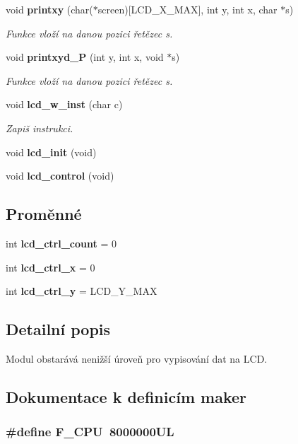 \begin{DoxyCompactItemize}
void {\bf printxy} (char($\ast$screen)[LCD\_\-X\_\-MAX], int y, int x, char $\ast$s)
\begin{DoxyCompactList}\small\item\em Funkce vloží na danou pozici řetězec {\itshape s\/}. \item\end{DoxyCompactList}\item 
void {\bf printxyd\_\-P} (int y, int x, void $\ast$s)
\begin{DoxyCompactList}\small\item\em Funkce vloží na danou pozici řetězec {\itshape s\/}. \item\end{DoxyCompactList}\item 
void {\bf lcd\_\-w\_\-inst} (char c)
\begin{DoxyCompactList}\small\item\em Zapiš instrukci. \item\end{DoxyCompactList}\item 
void {\bf lcd\_\-init} (void)
\item 
void {\bf lcd\_\-control} (void)
\end{DoxyCompactItemize}
\subsection*{Proměnné}
\begin{DoxyCompactItemize}
\item 
int {\bf lcd\_\-ctrl\_\-count} = 0
\item 
int {\bf lcd\_\-ctrl\_\-x} = 0
\item 
int {\bf lcd\_\-ctrl\_\-y} = LCD\_\-Y\_\-MAX
\end{DoxyCompactItemize}


\subsection{Detailní popis}
Modul obstarává nenižší úroveň pro vypisování dat na LCD. 

\subsection{Dokumentace k definicím maker}
\subsubsection[{F\_\-CPU}]{\setlength{\rightskip}{0pt plus 5cm}\#define F\_\-CPU~8000000UL}\label{lcd_8c_a43bafb28b29491ec7f871319b5a3b2f8}


